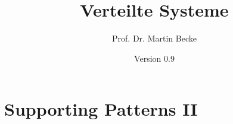 \documentclass[german,11pt]{beamer}
\title[VS]{Verteilte Systeme}
\author[BCK]{Prof. Dr. Martin Becke}
\date[0.9]{Version 0.9}
\institute[CaDS]{CaDS - HAW Hamburg}
\begin{document}
\begin{frame}
  \titlepage{}
\end{frame}
\section{Supporting Patterns II} 






\end{document}
